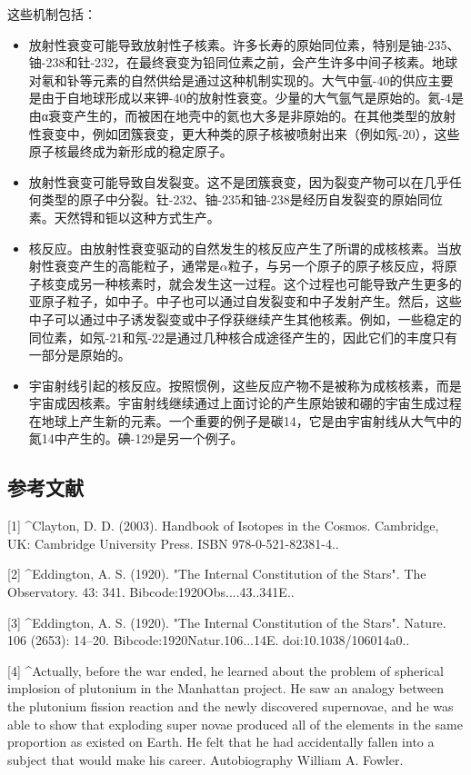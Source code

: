 这些机制包括：
\begin{itemize}
\item 放射性衰变可能导致放射性子核素。许多长寿的原始同位素，特别是铀-235、铀-238和钍-232，在最终衰变为铅同位素之前，会产生许多中间子核素。地球对氡和钋等元素的自然供给是通过这种机制实现的。大气中氩-40的供应主要是由于自地球形成以来钾-40的放射性衰变。少量的大气氩气是原始的。氦-4是由α衰变产生的，而被困在地壳中的氦也大多是非原始的。在其他类型的放射性衰变中，例如团簇衰变，更大种类的原子核被喷射出来（例如氖-20），这些原子核最终成为新形成的稳定原子。
\item 放射性衰变可能导致自发裂变。这不是团簇衰变，因为裂变产物可以在几乎任何类型的原子中分裂。钍-232、铀-235和铀-238是经历自发裂变的原始同位素。天然锝和钷以这种方式生产。
\item 核反应。由放射性衰变驱动的自然发生的核反应产生了所谓的成核核素。当放射性衰变产生的高能粒子，通常是$\alpha$粒子，与另一个原子的原子核反应，将原子核变成另一种核素时，就会发生这一过程。这个过程也可能导致产生更多的亚原子粒子，如中子。中子也可以通过自发裂变和中子发射产生。然后，这些中子可以通过中子诱发裂变或中子俘获继续产生其他核素。例如，一些稳定的同位素，如氖-21和氖-22是通过几种核合成途径产生的，因此它们的丰度只有一部分是原始的。
\item 宇宙射线引起的核反应。按照惯例，这些反应产物不是被称为成核核素，而是宇宙成因核素。宇宙射线继续通过上面讨论的产生原始铍和硼的宇宙生成过程在地球上产生新的元素。一个重要的例子是碳14，它是由宇宙射线从大气中的氮14中产生的。碘-129是另一个例子。
\end{itemize}

\subsection{参考文献}
[1]
^Clayton, D. D. (2003). Handbook of Isotopes in the Cosmos. Cambridge, UK: Cambridge University Press. ISBN 978-0-521-82381-4..

[2]
^Eddington, A. S. (1920). "The Internal Constitution of the Stars". The Observatory. 43: 341. Bibcode:1920Obs....43..341E..

[3]
^Eddington, A. S. (1920). "The Internal Constitution of the Stars". Nature. 106 (2653): 14–20. Bibcode:1920Natur.106...14E. doi:10.1038/106014a0..

[4]
^Actually, before the war ended, he learned about the problem of spherical implosion of plutonium in the Manhattan project. He saw an analogy between the plutonium fission reaction and the newly discovered supernovae, and he was able to show that exploding super novae produced all of the elements in the same proportion as existed on Earth. He felt that he had accidentally fallen into a subject that would make his career. Autobiography William A. Fowler.

